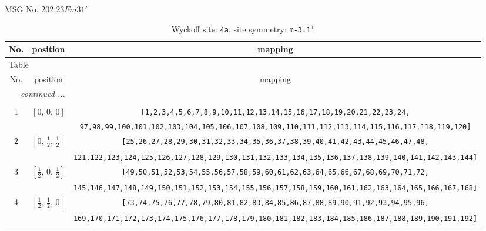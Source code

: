 \documentclass[fleqn,8pt]{jsarticle}
\begin{document}
\setcounter{MaxMatrixCols}{32}

\renewcommand{\tablename}{Table~}
\renewcommand{\figurename}{Figure~}
\begin{center}
\LARGE
MSG No. 202.23\quad$Fm\bar{3}1'$
\end{center}
\renewcommand{\arraystretch}{1.2}
\begin{longtable}{ccc}
\caption{Wyckoff site: {\tt 4a}, site symmetry: {\tt m-3.1'}}
 \\
 \hline \hline
No. & position & mapping \\ \hline \endfirsthead

\multicolumn{2}{l}{\tablename\ \thetable{}} \\
 \hline \hline
No. & position & mapping \\ \hline \endhead

 \hline \hline
\multicolumn{2}{r}{\footnotesize\it continued ...} \\ \endfoot

 \hline \hline
\multicolumn{2}{r}{} \\ \endlastfoot

1 & $\left[ 0,\, 0,\, 0 \right]$ & {\tt [1,2,3,4,5,6,7,8,9,10,11,12,13,14,15,16,17,18,19,20,21,22,23,24,} \\ \hline
 &  & {\tt 97,98,99,100,101,102,103,104,105,106,107,108,109,110,111,112,113,114,115,116,117,118,119,120]} \\ \hline
2 & $\left[ 0,\, \frac{1}{2},\, \frac{1}{2} \right]$ & {\tt [25,26,27,28,29,30,31,32,33,34,35,36,37,38,39,40,41,42,43,44,45,46,47,48,} \\ \hline
 &  & {\tt 121,122,123,124,125,126,127,128,129,130,131,132,133,134,135,136,137,138,139,140,141,142,143,144]} \\ \hline
3 & $\left[ \frac{1}{2},\, 0,\, \frac{1}{2} \right]$ & {\tt [49,50,51,52,53,54,55,56,57,58,59,60,61,62,63,64,65,66,67,68,69,70,71,72,} \\ \hline
 &  & {\tt 145,146,147,148,149,150,151,152,153,154,155,156,157,158,159,160,161,162,163,164,165,166,167,168]} \\ \hline
4 & $\left[ \frac{1}{2},\, \frac{1}{2},\, 0 \right]$ & {\tt [73,74,75,76,77,78,79,80,81,82,83,84,85,86,87,88,89,90,91,92,93,94,95,96,} \\ \hline
 &  & {\tt 169,170,171,172,173,174,175,176,177,178,179,180,181,182,183,184,185,186,187,188,189,190,191,192]} \\
\end{longtable}
\renewcommand{\arraystretch}{1.2}
\end{document}
